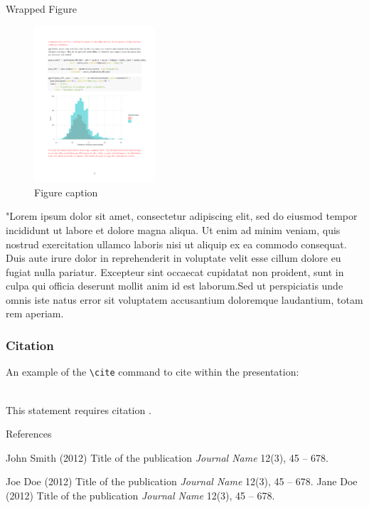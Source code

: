 \documentclass[aspectratio=169,xcolor=dvipsnames, t]{beamer}
\begin{document}
\begin{frame}{Wrapped Figure}
    \begin{figure}
    \centering
    \includegraphics[width=0.4\textwidth]{figures/results_fig.pdf}
    \caption{Figure caption}
\end{figure}
"Lorem ipsum dolor sit amet, consectetur adipiscing elit, sed do eiusmod tempor incididunt ut labore et dolore magna aliqua. Ut enim ad minim veniam, quis nostrud exercitation ullamco laboris nisi ut aliquip ex ea commodo consequat. Duis aute irure dolor in reprehenderit in voluptate velit esse cillum dolore eu fugiat nulla pariatur. Excepteur sint occaecat cupidatat non proident, sunt in culpa qui officia deserunt mollit anim id est laborum.Sed ut perspiciatis unde omnis iste natus error sit voluptatem accusantium doloremque laudantium, totam rem aperiam.
\end{frame}

\begin{frame}[fragile] %
    \frametitle{Citation}
    An example of the \verb|\cite| command to cite within the presentation:\\~

    This statement requires citation \cite{p1}.
\end{frame}

\begin{frame}{References}
    \footnotesize{
        \begin{thebibliography}{99}
             John Smith (2012)
            \newblock Title of the publication
            \newblock \emph{Journal Name} 12(3), 45 -- 678.

             Joe Doe (2012)
            \newblock Title of the publication
            \newblock \emph{Journal Name} 12(3), 45 -- 678.
             Jane Doe (2012)
            \newblock Title of the publication
            \newblock \emph{Journal Name} 12(3), 45 -- 678.
        \end{thebibliography}
    }
\end{frame}
\end{document}
